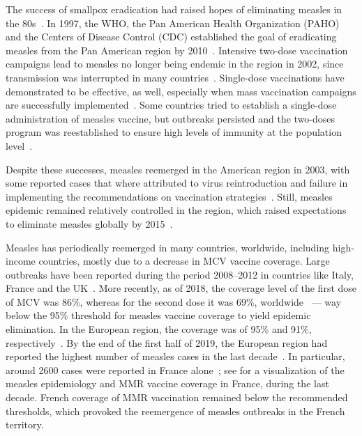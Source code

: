 The success of smallpox eradication had raised hopes of eliminating measles in the 80s~\cite[]{Hopkins1982}. In 1997, the WHO, the Pan American Health Organization (PAHO) and the Centers of Disease Control (CDC) established the goal of eradicating measles from the Pan American region by 2010~\cite[]{MMWR_MeaslesErradication1997}. Intensive two-dose vaccination campaigns lead to measles no longer being endemic in the region in 2002, since transmission was interrupted in many countries~\cite[]{Sever2011,DeQuadros2004}. 
%
Single-dose vaccinations have demonstrated to be effective, as well, especially when mass vaccination campaigns are successfully implemented~\cite[]{Sever2011}. Some countries tried to establish a single-dose administration of measles vaccine, but outbreaks persisted and the two-doses program was reestablished to ensure high levels of immunity at the population level~\cite[]{Strebel2013}. 

Despite these successes, measles reemerged in the American region in 2003, with some reported cases that where attributed to virus reintroduction and failure in implementing the recommendations on vaccination strategies~\cite[]{MMWR_MeaslesErradication1997,DeQuadros2004,Andrus2011}. Still, measles epidemic remained relatively controlled in the region, which raised expectations to eliminate measles globally by 2015~\cite[]{DeQuadros2004}. %

Measles has periodically reemerged in many countries, worldwide, including high-income countries, mostly due to a decrease in MCV vaccine coverage. 
Large outbreaks have been reported during the period 2008--2012 in countries like Italy, France and the UK~\cite[]{Amendola2015,Antona2013,Keenan2017,Bechini2019}. More recently, as of 2018, the coverage level of the first dose of MCV was 86\%, whereas for the second dose it was 69\%, worldwide~\cite[]{Peck2018} --- way below the 95\% threshold for measles vaccine coverage to yield epidemic elimination. In the European region, the coverage was of 95\% and 91\%, respectively~\cite[]{Peck2018}. By the end of the first half of 2019, the European region had reported the highest number of measles cases in the last decade~\cite[]{WHO_MeaslesEUR2018,ECDC_MR2019}. In particular, around 2600 cases were reported in France alone~\cite[]{WHO_MeaslesFrance2020}; see  for a visualization of the measles epidemiology and MMR vaccine coverage in France, during the last decade. French coverage of MMR vaccination remained below the recommended thresholds, which provoked the reemergence of measles outbreaks in the French territory.

